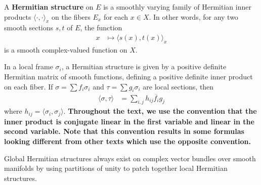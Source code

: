 \documentclass[12pt]{article}
\begin{document}
\begin{definition}
A \textbf{Hermitian structure} on $E$ is a smoothly varying family of Hermitian inner products $\langle \cdot, \cdot \rangle_x$ on the fibers $E_x$ for each $x \in X$. In other words, for any two smooth sections $s, t$ of $E$, the function \begin{align*}
    x & \mapsto \langle s(x), t(x) \rangle_x
\end{align*} is a smooth complex-valued function on $X$.
\end{definition}
In a local frame $\sigma_i$, a Hermitian structure is given by a positive definite Hermitian matrix of smooth functions, defining a positive definite inner product on each fiber. If $\sigma = \sum f_i \sigma_i$ and $\tau = \sum g_i \sigma_i$ are local sections, then \begin{align*}
    \langle \sigma, \tau \rangle & = \sum_{i,j} h_{ij} \overline{f_i} g_j
\end{align*} where $h_{ij} = \langle \sigma_i, \sigma_j \rangle$. \textbf{Throughout the text, we use the convention that the inner product is conjugate linear in the first variable and linear in the second variable. Note that this convention results in some formulas looking different from other texts which use the opposite convention.}

Global Hermitian structures always exist on complex vector bundles over smooth manifolds by using partitions of unity to patch together local Hermitian structures.
\end{document}
